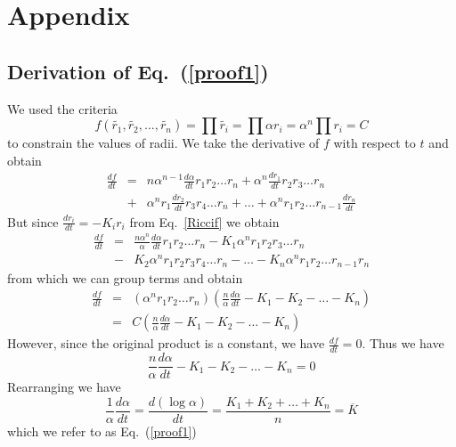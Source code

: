 \documentclass[12pt]{article}
\begin{document}
\newpage
  


\newpage
\section{Appendix}

\subsection{Derivation of Eq.~(\ref{proof1})}
\maketitle
	
	We used the criteria $$f(\tilde{r_1},\tilde{r_2},\ldots,\tilde{r_n}) = \prod{\tilde{r_i}} = \prod{\alpha r_i} = \alpha^n\prod{r_i}= C$$ to constrain the values of radii. We take the derivative of $f$ with respect to $t$ and obtain
	\begin{eqnarray*}
	\frac{df}{dt} & = & n\alpha^{n-1}\frac{d\alpha}{dt}r_1r_2\ldots r_n + \alpha^n\frac{dr_1}{dt}r_2r_3\ldots r_n\\
								& + & \alpha^nr_1\frac{dr_2}{dt}r_3r_4\ldots r_n + \ldots + \alpha^nr_1r_2\ldots r_{n-1}\frac{dr_n}{dt}
	\end{eqnarray*}
	But since $\displaystyle \frac{dr_i}{dt} = -K_ir_i$ from Eq.~\ref{Riccif} we obtain
	\begin{eqnarray*}
	\frac{df}{dt} & = & \frac{n\alpha^{n}}{\alpha}\frac{d\alpha}{dt}r_1r_2\ldots r_n - K_1\alpha^nr_1r_2r_3\ldots r_n\\
								& - & K_2\alpha^nr_1r_2r_3r_4\ldots r_n - \ldots - K_n\alpha^nr_1r_2\ldots r_{n-1}r_n
	\end{eqnarray*}
	from which we can group terms and obtain
	\begin{eqnarray*}
	\frac{df}{dt} & = & (\alpha^nr_1r_2\ldots r_n)(\frac{n}{\alpha}\frac{d\alpha}{dt} - K_1 - K_2 - \ldots - K_n)\\
								& = & C(\frac{n}{\alpha}\frac{d\alpha}{dt} - K_1 - K_2 - \ldots - K_n)
	\end{eqnarray*}
	However, since the original product is a constant, we have $\displaystyle \frac{df}{dt} = 0.$ Thus we have $$\frac{n}{\alpha}\frac{d\alpha}{dt} - K_1 - K_2 - \ldots - K_n = 0$$
	Rearranging we have
$$\frac{1}{\alpha}\frac{d\alpha}{dt} = \frac{d(\log \alpha)}{dt} = \frac{K_1 + K_2 + \ldots + K_n}{n} = \overline{K}$$
	which we refer to as Eq.~(\ref{proof1})
  
\end{document}

